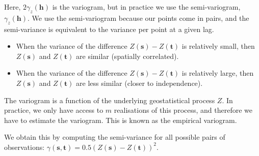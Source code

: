 \documentclass[
  letterpaper,
  DIV=11,
  numbers=noendperiod]{scrartcl}
\begin{document}
Here, \(2\gamma_z(\mathbf{h})\) is the variogram, but in practice we use
the semi-variogram, \(\gamma_z(\mathbf{h})\). We use the semi-variogram
because our points come in pairs, and the semi-variance is equivalent to
the variance per point at a given lag.

\begin{itemize}
\item
  When the variance of the difference \(Z(\mathbf{s}) - Z(\mathbf{t})\)
  is relatively small, then \(Z(\mathbf{s})\) and \(Z(\mathbf{t})\) are
  similar (spatially correlated).
\item
  When the variance of the difference \(Z(\mathbf{s}) - Z(\mathbf{t})\)
  is relatively large, then \(Z(\mathbf{s})\) and \(Z(\mathbf{t})\) are
  less similar (closer to independence).
\end{itemize}

The variogram is a function of the underlying geostatistical process
\(Z\). In practice, we only have access to \(m\) realisations of this
process, and therefore we have to estimate the variogram. This is known
as the empirical variogram.

We obtain this by computing the semi-variance for all possible pairs of
observations:
\(\gamma(\mathbf{s}, \mathbf{t}) = 0.5(Z(\mathbf{s}) - Z(\mathbf{t}))^2\).
\end{document}
